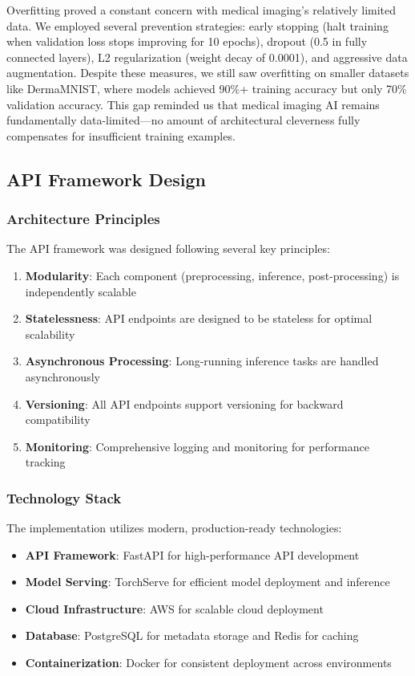 \documentclass[12pt,a4paper]{article}
\begin{document}
Overfitting proved a constant concern with medical imaging's relatively limited data. We employed several prevention strategies: early stopping (halt training when validation loss stops improving for 10 epochs), dropout (0.5 in fully connected layers), L2 regularization (weight decay of 0.0001), and aggressive data augmentation. Despite these measures, we still saw overfitting on smaller datasets like DermaMNIST, where models achieved 90\%+ training accuracy but only 70\% validation accuracy. This gap reminded us that medical imaging AI remains fundamentally data-limited—no amount of architectural cleverness fully compensates for insufficient training examples.

\subsection{API Framework Design}

\subsubsection{Architecture Principles}

The API framework was designed following several key principles:

\begin{enumerate}
    \item \textbf{Modularity}: Each component (preprocessing, inference, post-processing) is independently scalable
    \item \textbf{Statelessness}: API endpoints are designed to be stateless for optimal scalability
    \item \textbf{Asynchronous Processing}: Long-running inference tasks are handled asynchronously
    \item \textbf{Versioning}: All API endpoints support versioning for backward compatibility
    \item \textbf{Monitoring}: Comprehensive logging and monitoring for performance tracking
\end{enumerate}

\subsubsection{Technology Stack}

The implementation utilizes modern, production-ready technologies:

\begin{itemize}
    \item \textbf{API Framework}: FastAPI for high-performance API development
    \item \textbf{Model Serving}: TorchServe for efficient model deployment and inference
    \item \textbf{Cloud Infrastructure}: AWS for scalable cloud deployment
    \item \textbf{Database}: PostgreSQL for metadata storage and Redis for caching
    \item \textbf{Containerization}: Docker for consistent deployment across environments
\end{itemize}
\end{document}

